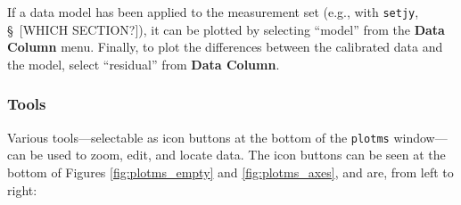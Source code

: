 If a data model has been applied to the measurement set (e.g., with {\tt setjy}, \S~[WHICH SECTION?]), it can be plotted by selecting ``model'' from the {\bf Data Column} menu. Finally, to plot the differences between the calibrated data and the model, select ``residual'' from {\bf Data Column}.


\subsubsection{Tools}
\label{section:edit.plot.plotms.tools}

Various tools---selectable as icon buttons at the bottom of the {\tt plotms} window---can be used to zoom, edit, and locate data. The icon buttons can be seen at the bottom of Figures \ref{fig:plotms_empty} and \ref{fig:plotms_axes}, and are, from left to right:
